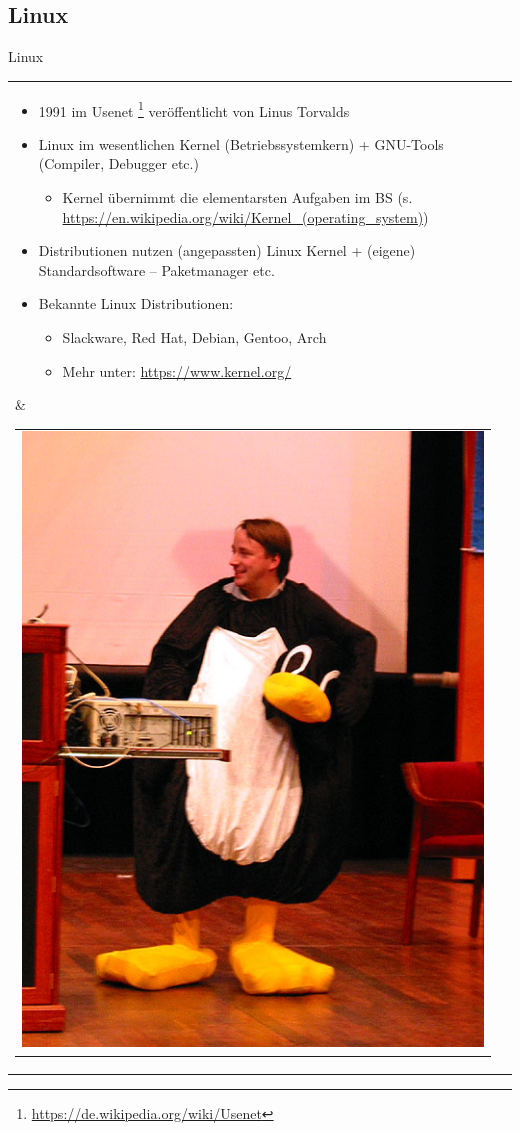 \documentclass[xcolor=dvipsnames,aspectratio=169]{beamer}
\begin{document}
\subsection{Linux}
\begin{frame}{Linux}
\begin{tabular}{lc}
\hspace{-1.3cm}
 \parbox{0.65\linewidth}{
 \vspace{-0.25cm}
\begin{itemize}
	\item 1991 im Usenet \footnote{\url{https://de.wikipedia.org/wiki/Usenet}} veröffentlicht von Linus Torvalds
	\item Linux im wesentlichen Kernel (Betriebssystemkern) + GNU-Tools (Compiler, Debugger etc.)
	\begin{itemize}
		\item Kernel übernimmt die elementarsten Aufgaben im BS (s. \url{https://en.wikipedia.org/wiki/Kernel_(operating_system)})
	\end{itemize}
	\item Distributionen nutzen (angepassten) Linux Kernel + (eigene) Standardsoftware -- Paketmanager etc.
	\item Bekannte Linux Distributionen:
	\begin{itemize}
	\item Slackware, Red Hat, Debian, Gentoo, Arch
	\item Mehr unter: \url{https://www.kernel.org/}
	\end{itemize}
\end{itemize} } 
& \begin{tabular}{c}
 \hspace{1.5cm}
           \includegraphics[scale=0.215]{linus}

\end{tabular}
\end{tabular}
\end{frame}
\end{document}
